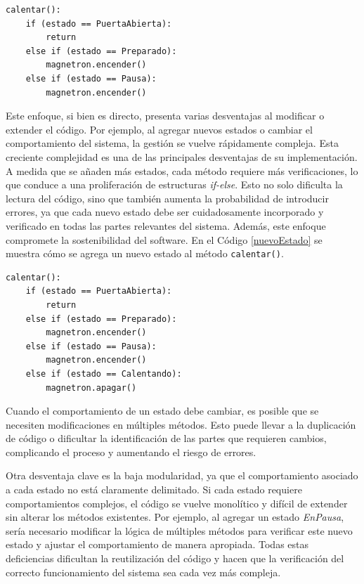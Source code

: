 \begin{lstlisting}[label=codigoMicro,caption={Ejemplo de manejo de estados tradicional, en el caso del microondas.}]
calentar():
    if (estado == PuertaAbierta):
        return
    else if (estado == Preparado):
        magnetron.encender()
    else if (estado == Pausa):
    	magnetron.encender()

\end{lstlisting}

Este enfoque, si bien es directo, presenta varias desventajas al modificar o extender el código. Por ejemplo, al agregar nuevos estados o cambiar el comportamiento del sistema, la gestión se vuelve rápidamente compleja. Esta creciente complejidad es una de las principales desventajas de su implementación. A medida que se añaden más estados, cada método requiere más verificaciones, lo que conduce a una proliferación de estructuras \textit{if-else}. Esto no solo dificulta la lectura del código, sino que también aumenta la probabilidad de introducir errores, ya que cada nuevo estado debe ser cuidadosamente incorporado y verificado en todas las partes relevantes del sistema. Además, este enfoque compromete la sostenibilidad del software. En el Código \ref{nuevoEstado} se muestra cómo se agrega un nuevo estado al método \verb|calentar()|.

\begin{lstlisting}[label=nuevoEstado,caption={Ejemplo de introducción de un nuevo estado a la solución tradicional.}]
calentar():
    if (estado == PuertaAbierta):
        return
    else if (estado == Preparado):
        magnetron.encender()
    else if (estado == Pausa):
    	magnetron.encender()
    else if (estado == Calentando):
    	magnetron.apagar()

\end{lstlisting}

Cuando el comportamiento de un estado debe cambiar, es posible que se necesiten modificaciones en múltiples métodos. Esto puede llevar a la duplicación de código o dificultar la identificación de las partes que requieren cambios, complicando el proceso y aumentando el riesgo de errores. 

Otra desventaja clave es la baja modularidad, ya que el comportamiento asociado a cada estado no está claramente delimitado. Si cada estado requiere comportamientos complejos, el código se vuelve monolítico y difícil de extender sin alterar los métodos existentes. Por ejemplo, al agregar un estado \textit{EnPausa}, sería necesario modificar la lógica de múltiples métodos para verificar este nuevo estado y ajustar el comportamiento de manera apropiada. Todas estas deficiencias dificultan la reutilización del código y hacen que la verificación del correcto funcionamiento del sistema sea cada vez más compleja.

